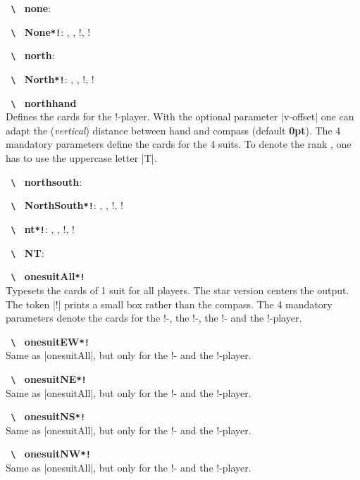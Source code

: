 \documentclass[a4paper,fontsize=11pt,%
  danish,%
  dutch,%
  french,%
  german,%
  norsk,%
  spanish,%
  swedish,%
  turkish,%
  english,%
]{scrartcl}
\newcommand\bs{%
  \texttt{%
    \upshape%
    \textbackslash%
  }%
}%
\let\olditem\item
\renewcommand\item[1][\relax]{\olditem\textbf{\bs#1}}
\newcommand\Oarg[1]{\colorbox{optbackgr}{\texttt{#1}}}
\begin{document}
\begin{description}[itemsep=-0.3em]
\item[none]: \none
\item[None\Oarg{*!}]: \None, \None*, \None!, \None*! 

\item[north]: \north 
\item[North\Oarg{*!}]: \North, \North*, \North!, \North*! 

\item[northhand]\\
Defines the cards for the
\North*!-player. With the optional parameter |v-offset| one can adapt the
(\emph{vertical}) distance between hand and compass (default \textbf{0pt}).
The 4 mandatory parameters define the cards for the 4 suits. To denote the
rank , one has to use the uppercase letter |T|.

\item[northsouth]: \northsouth 
\item[NorthSouth\Oarg{*!}]: \NorthSouth, \NorthSouth*, \NorthSouth!, \NorthSouth*! 

\item[nt\Oarg{*!}]: \nt, \nt*, \nt!, \nt*! 
\item[NT]: \NT 

\item[onesuitAll\Oarg{*!}]\\
Typesets the cards of 1 suit for all
players. The star version centers the output. The token |!| prints a small
box rather than the compass. The 4 mandatory parameters denote the cards
for the \North*!-, the \South*!-, the \East*!- and the \West*!-player.

\item[onesuitEW\Oarg{*!}]\\
Same as |onesuitAll|, but only for the \East*!- and the \West*!-player.

\item[onesuitNE\Oarg{*!}]\\
Same as |onesuitAll|, but only for the \North*!- and the \East*!-player.

\item[onesuitNS\Oarg{*!}]\\
Same as |onesuitAll|, but only for the \North*!- and the \South*!-player.

\item[onesuitNW\Oarg{*!}]\\
Same as |onesuitAll|, but only for the \North*!- and the \West*!-player.


\end{description}
\end{document}
